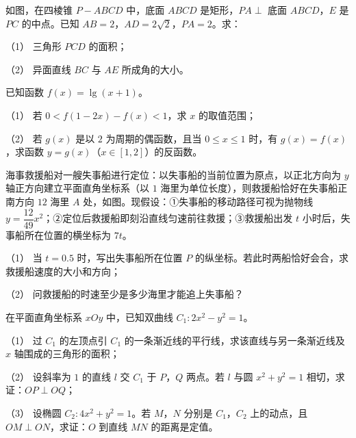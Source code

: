 \Needspace{0.4\textheight}
\begin{question}
如图，在四棱锥 $P-ABCD$ 中，底面 $ABCD$ 是矩形，$PA\perp$ 底面 $ABCD$，$E$ 是 $PC$ 的中点。已知 $AB=2$，$AD=2\sqrt2$，$PA=2$。求：

（1） 三角形 $PCD$ 的面积；

（2） 异面直线 $BC$ 与 $AE$ 所成角的大小。
\nopagebreak[4]
\begin{center}\end{center}
\nopagebreak[4]
\end{question}
\begin{question}
已知函数 $f(x)=\lg(x+1)$。

（1） 若 $0<f(1-2x)-f(x)<1$，求 $x$ 的取值范围；

（2） 若 $g(x)$ 是以 $2$ 为周期的偶函数，且当 $0\leqslant x\leqslant1$ 时，有 $g(x)=f(x)$，求函数 $y=g(x)$（$x\in[1,2]$）的反函数。

\Needspace{0.4\textheight}
\end{question}
\begin{question}
海事救援船对一艘失事船进行定位：以失事船的当前位置为原点，以正北方向为 $y$ 轴正方向建立平面直角坐标系（以 $1$ 海里为单位长度），则救援船恰好在失事船正南方向 $12$ 海里 $A$ 处，如图。现假设：①失事船的移动路径可视为抛物线 $y=\dfrac{12}{49}x^2$；②定位后救援船即刻沿直线匀速前往救援；③救援船出发 $t$ 小时后，失事船所在位置的横坐标为 $7t$。

（1） 当 $t=0.5$ 时，写出失事船所在位置 $P$ 的纵坐标。若此时两船恰好会合，求救援船速度的大小和方向；

（2） 问救援船的时速至少是多少海里才能追上失事船？
\nopagebreak[4]
\begin{center}\end{center}
\nopagebreak[4]
\end{question}
\begin{question}
在平面直角坐标系 $xOy$ 中，已知双曲线 $C_1:2x^2-y^2=1$。

（1） 过 $C_1$ 的左顶点引 $C_1$ 的一条渐近线的平行线，求该直线与另一条渐近线及 $x$ 轴围成的三角形的面积；

（2） 设斜率为 $1$ 的直线 $l$ 交 $C_1$ 于 $P$，$Q$ 两点。若 $l$ 与圆 $x^2+y^2=1$ 相切，求证：$OP\perp OQ$；

（3） 设椭圆 $C_2:4x^2+y^2=1$。若 $M$，$N$ 分别是 $C_1$，$C_2$ 上的动点，且 $OM\perp ON$，求证：$O$ 到直线 $MN$ 的距离是定值。

\end{question}
